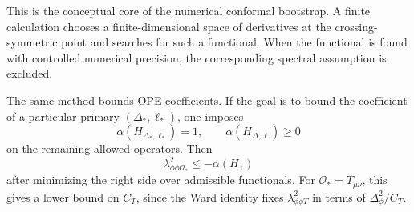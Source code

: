 This is the conceptual core of the numerical conformal bootstrap.  A finite
calculation chooses a finite-dimensional space of derivatives at the
crossing-symmetric point and searches for such a functional.  When the
functional is found with controlled numerical precision, the corresponding
spectral assumption is excluded.

The same method bounds OPE coefficients.  If the goal is to bound the
coefficient of a particular primary \((\Delta_\ast,\ell_\ast)\), one imposes
\[
  \alpha(H_{\Delta_\ast,\ell_\ast})=1,
  \qquad
  \alpha(H_{\Delta,\ell})\ge0
\]
on the remaining allowed operators.  Then
\[
  \lambda_{\phi\phi\mathcal O_\ast}^2
  \le
  -\alpha(H_{\mathbf1})
\]
after minimizing the right side over admissible functionals.  For
\(\mathcal O_\ast=T_{\mu\nu}\), this gives a lower bound on \(C_T\), since
the Ward identity fixes \(\lambda_{\phi\phi T}^2\) in terms of
\(\Delta_\phi^2/C_T\).
